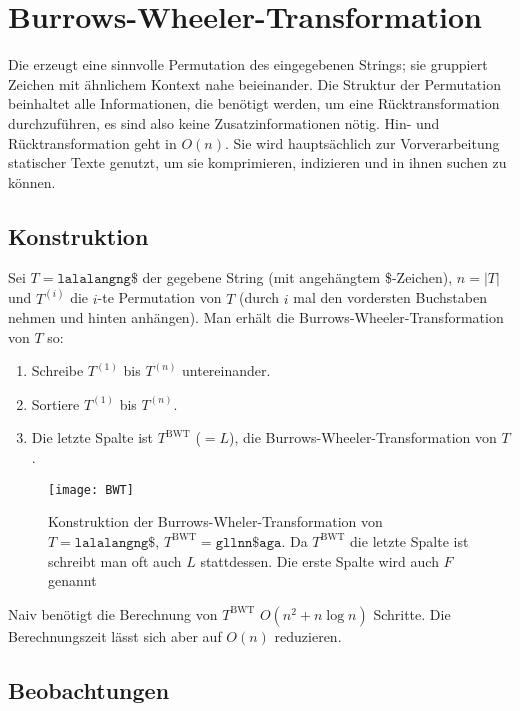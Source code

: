 \chapter{Burrows-Wheeler-Transformation}

Die  erzeugt eine sinnvolle Permutation des eingegebenen Strings; sie gruppiert Zeichen mit ähnlichem Kontext nahe beieinander. Die Struktur der Permutation beinhaltet alle Informationen, die benötigt werden, um eine Rücktransformation durchzuführen, es sind also keine Zusatzinformationen nötig. Hin- und Rücktransformation geht in \( O(n) \). Sie wird hauptsächlich zur Vorverarbeitung statischer Texte genutzt, um sie komprimieren, indizieren und in ihnen suchen zu können.

\section{Konstruktion}

Sei \( T = \texttt{lalalangng\$} \) der gegebene String (mit angehängtem \$-Zeichen), \( n = \left\vert T \right\vert \) und \( T^{(i)} \) die \( i \)-te Permutation von \( T \) (durch \( i \) mal den vordersten Buchstaben nehmen und hinten anhängen). Man erhält die Burrows-Wheeler-Transformation von \( T \) so:

\begin{enumerate}
  \item Schreibe \( T^{(1)} \) bis \( T^{(n)} \) untereinander.
  \item Sortiere \( T^{(1)} \) bis \( T^{(n)} \).
  \item Die letzte Spalte ist \( T^{\text{BWT}} \) (\( = L \)), die Burrows-Wheeler-Transformation von \( T \).
\end{enumerate}

\begin{figure}[H]
  \texttt{[image: BWT]}
  \caption{Konstruktion der Burrows-Wheler-Transformation von \( T = \texttt{lalalangng\$}  \), \( T^{\text{BWT}} = \texttt{gllnn\$ aga} \). Da \( T^{\text{BWT}} \) die letzte Spalte ist schreibt man oft auch \( L \) stattdessen. Die erste Spalte wird auch \( F \) genannt}
\end{figure}

Naiv benötigt die Berechnung von \( T^{\text{BWT}} \) \( O(n^2 + n\log n) \) Schritte. Die Berechnungszeit lässt sich aber auf \( O(n) \) reduzieren.

\section{Beobachtungen}

